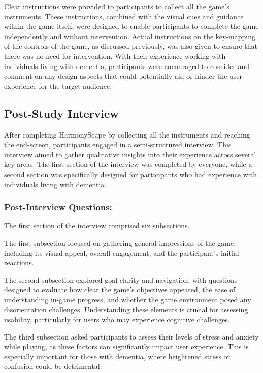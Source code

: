 \documentclass{l4proj}
\begin{document}
Clear instructions were provided to participants to collect all the game's instruments. These instructions, combined with the visual cues and guidance within the game itself, were designed to enable participants to complete the game independently and without intervention. Actual instructions on the key-mapping of the controls of the game, as discussed previously, was also given to ensure that there was no need for intervention. With their experience working with individuals living with dementia, participants were encouraged to consider and comment on any design aspects that could potentially aid or hinder the user experience for the target audience.

\subsection{Post-Study Interview}
After completing HarmonyScape by collecting all the instruments and reaching the end-screen, participants engaged in a semi-structured interview. This interview aimed to gather qualitative insights into their experience across several key areas.  The first section of the interview was completed by everyone, while a second section was specifically designed for participants who had experience with individuals living with dementia.

\subsubsection{Post-Interview Questions:}
The first section of the interview comprised six subsections. 

The first subsection focused on gathering general impressions of the game, including its visual appeal, overall engagement, and the participant's initial reactions.  %

The second subsection explored goal clarity and navigation, with questions designed to evaluate how clear the game's objectives appeared, the ease of understanding in-game progress, and whether the game environment posed any disorientation challenges.  Understanding these elements is crucial for assessing usability,  particularly for users who may experience cognitive challenges.  

The third subsection asked participants to assess their levels of stress and anxiety while playing, as these factors can significantly impact user experience. This is especially important for those with dementia, where heightened stress or confusion could be detrimental.
\end{document}
